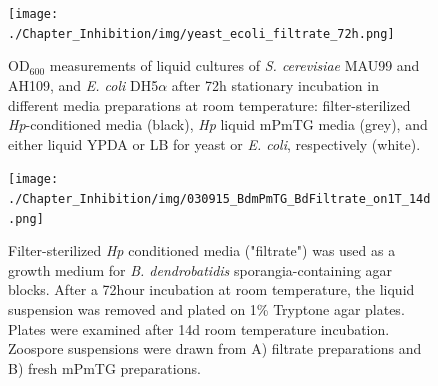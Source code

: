 
\begin{figure}[hb]
  \centering
  \texttt{[image: ./Chapter\_Inhibition/img/yeast\_ecoli\_filtrate\_72h.png]}
  \caption[Growth of yeast and bacterial cultures in liquid media is also inhibited by \textit{Hp} conditioned media.]{OD$_{600}$ measurements of liquid cultures of \textit{S. cerevisiae} MAU99 and AH109, and \textit{E. coli} DH5$\alpha$ after 72h stationary incubation in different media preparations at room temperature: filter-sterilized \textit{Hp}-conditioned media (black), \textit{Hp} liquid mPmTG media (grey), and either liquid YPDA or LB for yeast or \textit{E. coli}, respectively (white).}
  \label{fig:ChInhib_HpYeastEcoli}
\end{figure}


\begin{figure}[hb]
  \centering
  \texttt{[image: ./Chapter\_Inhibition/img/030915\_BdmPmTG\_BdFiltrate\_on1T\_14d.png]}
  \caption[Incubation in \textit{H. polyrhiza} conditioned media prevents encystment and subsequent growth of \textit{B. dendrobatidis} zoospores]{Filter-sterilized \textit{Hp} conditioned media ("filtrate") was used as a growth medium for \textit{B. dendrobatidis} sporangia-containing agar blocks. After a 72hour incubation at room temperature, the liquid suspension was removed and plated on 1\% Tryptone agar plates. Plates were examined after 14d room temperature incubation. Zoospore suspensions were drawn from A) filtrate preparations and B) fresh mPmTG preparations.}
  \label{fig:ChInhib_HpvsBd}
\end{figure}
